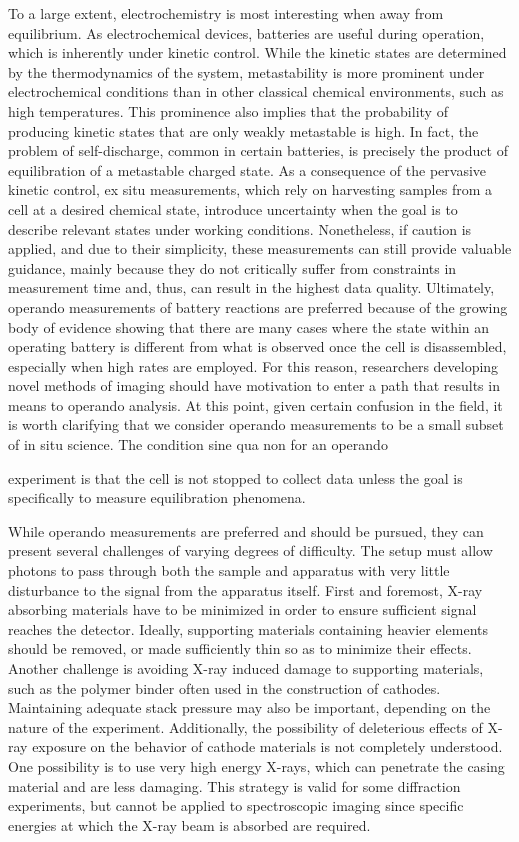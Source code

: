 \documentclass[journal=cmatex,manuscript=perspective]{achemso}
\begin{document}
To a large extent, electrochemistry is most interesting when away from
equilibrium. As electrochemical devices, batteries are useful during
operation, which is inherently under kinetic control. While the
kinetic states are determined by the thermodynamics of the system,
metastability is more prominent under electrochemical conditions than
in other classical chemical environments, such as high
temperatures. This prominence also implies that the probability of
producing kinetic states that are only weakly metastable is high. In
fact, the problem of self-discharge, common in certain batteries, is
precisely the product of equilibration of a metastable charged
state. As a consequence of the pervasive kinetic control, ex situ
measurements, which rely on harvesting samples from a cell at a
desired chemical state, introduce uncertainty when the goal is to
describe relevant states under working conditions. Nonetheless, if
caution is applied, and due to their simplicity, these measurements
can still provide valuable guidance\cite{yu2015-2}, mainly because
they do not critically suffer from constraints in measurement time
and, thus, can result in the highest data quality. Ultimately,
operando measurements of battery reactions are preferred because of
the growing body of evidence showing that there are many cases where
the state within an operating battery is different from what is
observed once the cell is disassembled\cite{liu2014, lim2016},
especially when high rates are employed. For this reason, researchers
developing novel methods of imaging should have motivation to enter a
path that results in means to operando analysis. At this point, given
certain confusion in the field, it is worth clarifying that we
consider operando measurements to be a small subset of in situ
science. The condition sine qua non for an operando

experiment is that the cell is not stopped to collect data unless the
goal is specifically to measure equilibration phenomena.

While operando measurements are preferred and should be pursued, they
can present several challenges of varying degrees of difficulty. The
setup must allow photons to pass through both the sample and apparatus
with very little disturbance to the signal from the apparatus
itself. First and foremost, X-ray absorbing materials have to be
minimized in order to ensure sufficient signal reaches the
detector. Ideally, supporting materials containing heavier elements
should be removed, or made sufficiently thin so as to minimize their
effects. Another challenge is avoiding X-ray induced damage to
supporting materials, such as the polymer binder often used in the
construction of cathodes. Maintaining adequate stack pressure may also
be important, depending on the nature of the
experiment\cite{borkiewicz2015}. Additionally, the possibility of
deleterious effects of X-ray exposure on the behavior of cathode
materials is not completely understood. One possibility is to use very
high energy X-rays, which can penetrate the casing
material\cite{lin2013} and are less damaging. This strategy is valid
for some diffraction experiments, but cannot be applied to
spectroscopic imaging since specific energies at which the X-ray beam
is absorbed are required.
\end{document}
